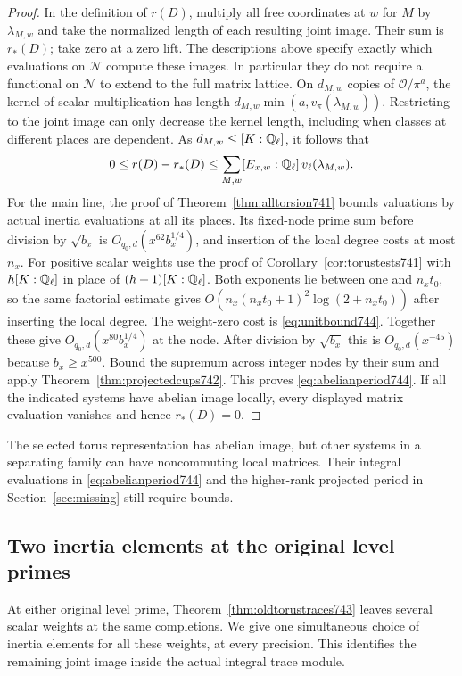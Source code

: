 \documentclass[a4paper,11pt]{article}
\theoremstyle{definition}
\theoremstyle{remark}
\numberwithin{equation}{section}
\begin{document}
\begin{proof}
In the definition of \(r(D)\), multiply all free coordinates at
\(w\) for \(M\) by \(\lambda_{M,w}\) and take the normalized
length of each resulting joint image. Their sum is \(r_*(D)\);
take zero at a zero lift. The descriptions above specify exactly
which evaluations on \(\mathcal N\) compute these images. In
particular they do not require a functional on \(\mathcal N\)
to extend to the full matrix lattice. On \(d_{M,w}\) copies of
\(\mathcal O/\pi^a\), the kernel of scalar multiplication has
length \(d_{M,w}\min(a,v_\pi(\lambda_{M,w}))\).
Restricting to the joint image can only decrease the kernel
length, including when classes at different places are dependent.
As \(d_{M,w}\le[K:\mathbb Q_\ell]\), it follows that
\[
   0\le r(D)-r_*(D)
       \le\sum_{M,w}[E_{x,w}:\mathbb Q_\ell]\,v_\ell(\lambda_{M,w}).
\]
For the main line, the proof of Theorem~\ref{thm:alltorsion741}
bounds valuations by actual inertia evaluations at all its places.
Its fixed-node prime sum before division by \(\sqrt{b_x}\) is
\(O_{q_0,d}(x^{62}b_x^{1/4})\), and insertion of the local degree
costs at most \(n_x\). For positive scalar weights use the proof
of Corollary~\ref{cor:torustests741} with \(h[K:\mathbb Q_\ell]\)
in place of \((h+1)[K:\mathbb Q_\ell]\). Both exponents lie between
one and \(n_xt_0\), so the same factorial estimate gives
\(O(n_x(n_xt_0+1)^2\log(2+n_xt_0))\) after inserting the
local degree. The weight-zero cost is \eqref{eq:unitbound744}.
Together these give \(O_{q_0,d}(x^{80}b_x^{1/4})\) at the node.
After division by \(\sqrt{b_x}\) this is \(O_{q_0,d}(x^{-45})\)
because \(b_x\ge x^{500}\). Bound the supremum across integer
nodes by their sum and apply Theorem~\ref{thm:projectedcups742}.
This proves \eqref{eq:abelianperiod744}. If all the indicated
systems have abelian image locally, every displayed matrix
evaluation vanishes and hence \(r_*(D)=0\).
\end{proof}

The selected torus representation has abelian image, but other
systems in a separating family can have noncommuting local
matrices. Their integral evaluations in
\eqref{eq:abelianperiod744} and the higher-rank projected period
in Section~\ref{sec:missing} still require bounds.
\clearpage

\subsection{Two inertia elements at the original level primes}
\label{sec:oldwild745}
At either original level prime, Theorem~\ref{thm:oldtorustraces743}
leaves several scalar weights at the same completions. We give
one simultaneous choice of inertia elements for all these weights,
at every precision. This identifies the remaining joint image inside
the actual integral trace module.
\end{document}
